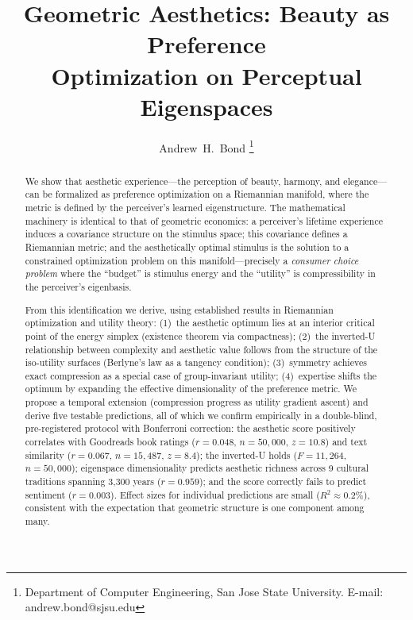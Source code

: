 \documentclass[journal]{IEEEtran}
\theoremstyle{definition}
\theoremstyle{remark}
\begin{document}
\title{Geometric Aesthetics: Beauty as Preference\\Optimization
on Perceptual Eigenspaces}

\author{Andrew~H.~Bond
\thanks{Department of Computer Engineering, San Jose State University.
E-mail: andrew.bond@sjsu.edu}}


\maketitle

\begin{abstract}
We show that aesthetic experience---the perception of beauty,
harmony, and elegance---can be formalized as preference optimization
on a Riemannian manifold, where the metric is defined by the
perceiver's learned eigenstructure.  The mathematical machinery is
identical to that of geometric economics: a perceiver's lifetime
experience induces a covariance structure on the stimulus space;
this covariance defines a Riemannian metric; and the aesthetically
optimal stimulus is the solution to a constrained optimization
problem on this manifold---precisely a \emph{consumer choice
problem} where the ``budget'' is stimulus energy and the ``utility''
is compressibility in the perceiver's eigenbasis.

From this identification we derive, using established results in
Riemannian optimization and utility theory:
(1)~the aesthetic optimum lies at an interior critical point of
the energy simplex (existence theorem via compactness);
(2)~the inverted-U relationship between complexity and aesthetic
value follows from the structure of the iso-utility surfaces
(Berlyne's law as a tangency condition);
(3)~symmetry achieves exact compression as a special case of
group-invariant utility;
(4)~expertise shifts the optimum by expanding the effective
dimensionality of the preference metric.
We propose a temporal extension (compression progress as utility
gradient ascent) and derive five testable predictions, all of which
we confirm empirically in a double-blind, pre-registered protocol
with Bonferroni correction: the aesthetic score positively correlates
with Goodreads book ratings ($r = 0.048$, $n = 50{,}000$,
$z = 10.8$) and text similarity ($r = 0.067$, $n = 15{,}487$,
$z = 8.4$); the inverted-U holds ($F = 11{,}264$, $n = 50{,}000$);
eigenspace dimensionality predicts aesthetic richness across 9
cultural traditions spanning 3{,}300 years ($r = 0.959$); and
the score correctly fails to predict sentiment ($r = 0.003$).
Effect sizes for individual predictions are small ($R^2 \approx
0.2\%$), consistent with the expectation that geometric structure
is one component among many.
\end{abstract}
\end{document}
